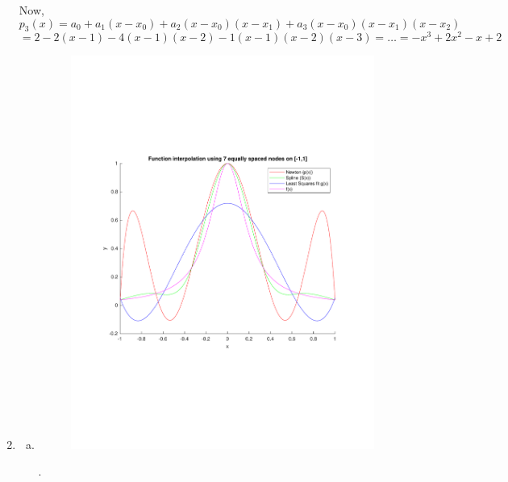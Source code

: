 \begin{enumerate}[1.]
Now,\\
$$p_3(x)=a_0+a_1(x-x_0)+a_2(x-x_0)(x-x_1)+a_3(x-x_0)(x-x_1)(x-x_2)$$$$=2-2(x-1)-4(x-1)(x-2)-1(x-1)(x-2)(x-3)=\dots=-x^3+2x^2-x+2$$

\item 
	\begin{enumerate}[(a)]

\item
\begin{figure}[h!]
\includegraphics[width=\textwidth]{q2a.pdf}
\end{figure}

.


\newpage


\end{enumerate}
\end{enumerate}
